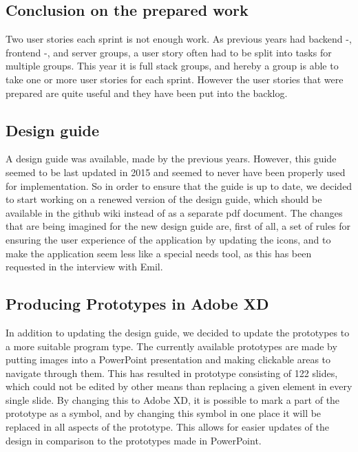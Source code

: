 \subsection{Conclusion on the prepared work}
Two user stories each sprint is not enough work. 
As previous years had backend -, frontend -, and server groups, a user story often had to be split into tasks for multiple groups.
This year it is full stack groups, and hereby a group is able to take one or more user stories for each sprint.
However the user stories that were prepared are quite useful and they have been put into the backlog.

\subsection{Design guide}
A design guide was available, made by the previous years.
However, this guide seemed to be last updated in 2015 and seemed to never have been properly used for implementation.
So in order to ensure that the guide is up to date, we decided to start working on a renewed version of the design guide, which should be available in the github wiki instead of as a separate pdf document.
The changes that are being imagined for the new design guide are, first of all, a set of rules for ensuring the user experience of the application by updating the icons, and to make the application seem less like a special needs tool, as this has been requested in the interview with Emil.

\subsection{Producing Prototypes in Adobe XD}
In addition to updating the design guide, we decided to update the prototypes to a more suitable program type.
The currently available prototypes are made by putting images into a PowerPoint presentation and making clickable areas to navigate through them.
This has resulted in prototype consisting of 122 slides, which could not be edited by other means than replacing a given element in every single slide.
By changing this to Adobe XD, it is possible to mark a part of the prototype as a symbol, and by changing this symbol in one place it will be replaced in all aspects of the prototype.
This allows for easier updates of the design in comparison to the prototypes made in PowerPoint.
